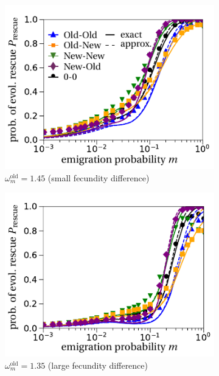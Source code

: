 \documentclass[11pt]{article}
\begin{document}
\begin{figure}[t!]
	\centering
	\begin{subfigure}{.5\textwidth}
  		\centering
  		\includegraphics[width=\linewidth]{fig5a.pdf}
  		\caption{$\omega^\text{old}_m=1.45$ (small fecundity difference)}
	\end{subfigure}%
	\begin{subfigure}{.5\textwidth}
  		\centering
  		\includegraphics[width=\linewidth]{fig5b.pdf}
  		\caption{$\omega^\text{old}_m=1.35$ (large fecundity difference)}
	\end{subfigure}
	\begin{subfigure}{.5\textwidth}

\end{subfigure}
\end{figure}
\end{document}
